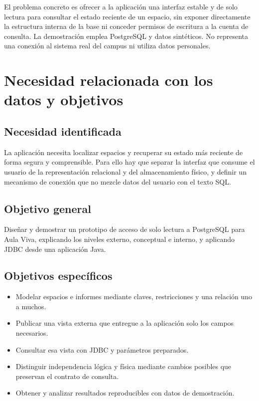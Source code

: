\documentclass[a4paper,12pt]{article}
\begin{document}
El problema concreto es ofrecer a la aplicación una interfaz estable y de solo lectura para consultar el estado reciente de un espacio, sin exponer directamente la estructura interna de la base ni conceder permisos de escritura a la cuenta de consulta. La demostración emplea PostgreSQL y datos sintéticos. No representa una conexión al sistema real del campus ni utiliza datos personales.

\section{Necesidad relacionada con los datos y objetivos}
\subsection{Necesidad identificada}
La aplicación necesita localizar espacios y recuperar su estado más reciente de forma segura y comprensible. Para ello hay que separar la interfaz que consume el usuario de la representación relacional y del almacenamiento físico, y definir un mecanismo de conexión que no mezcle datos del usuario con el texto SQL.

\subsection{Objetivo general}
Diseñar y demostrar un prototipo de acceso de solo lectura a PostgreSQL para Aula Viva, explicando los niveles externo, conceptual e interno, y aplicando JDBC desde una aplicación Java.

\subsection{Objetivos específicos}
\begin{itemize}[leftmargin=1.2cm]
  \item Modelar espacios e informes mediante claves, restricciones y una relación uno a muchos.
  \item Publicar una vista externa que entregue a la aplicación solo los campos necesarios.
  \item Consultar esa vista con JDBC y parámetros preparados.
  \item Distinguir independencia lógica y física mediante cambios posibles que preservan el contrato de consulta.
  \item Obtener y analizar resultados reproducibles con datos de demostración.
\end{itemize}
\end{document}
